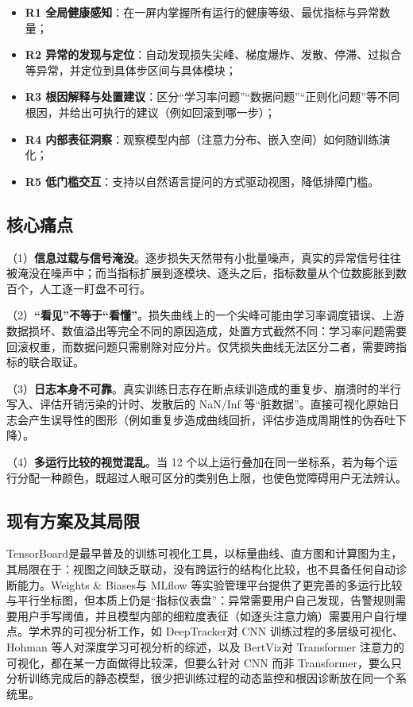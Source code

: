 \begin{itemize}
\item \textbf{R1 全局健康感知}：在一屏内掌握所有运行的健康等级、最优指标与异常数量；
\item \textbf{R2 异常的发现与定位}：自动发现损失尖峰、梯度爆炸、发散、停滞、过拟合等异常，并定位到具体步区间与具体模块；
\item \textbf{R3 根因解释与处置建议}：区分“学习率问题”“数据问题”“正则化问题”等不同根因，并给出可执行的建议（例如回滚到哪一步）；
\item \textbf{R4 内部表征洞察}：观察模型内部（注意力分布、嵌入空间）如何随训练演化；
\item \textbf{R5 低门槛交互}：支持以自然语言提问的方式驱动视图，降低排障门槛。
\end{itemize}

\subsection{核心痛点}

（1）\textbf{信息过载与信号淹没}。逐步损失天然带有小批量噪声，真实的异常信号往往被淹没在噪声中；而当指标扩展到逐模块、逐头之后，指标数量从个位数膨胀到数百个，人工逐一盯盘不可行。

（2）\textbf{“看见”不等于“看懂”}。损失曲线上的一个尖峰可能由学习率调度错误、上游数据损坏、数值溢出等完全不同的原因造成，处置方式截然不同：学习率问题需要回滚权重，而数据问题只需剔除对应分片。仅凭损失曲线无法区分二者，需要跨指标的联合取证。

（3）\textbf{日志本身不可靠}。真实训练日志存在断点续训造成的重复步、崩溃时的半行写入、评估开销污染的计时、发散后的 NaN/Inf 等“脏数据”。直接可视化原始日志会产生误导性的图形（例如重复步造成曲线回折，评估步造成周期性的伪吞吐下降）。

（4）\textbf{多运行比较的视觉混乱}。当 12 个以上运行叠加在同一坐标系，若为每个运行分配一种颜色，既超过人眼可区分的类别色上限，也使色觉障碍用户无法辨认。

\subsection{现有方案及其局限}

TensorBoard\cite{r4}是最早普及的训练可视化工具，以标量曲线、直方图和计算图为主，其局限在于：视图之间缺乏联动，没有跨运行的结构化比较，也不具备任何自动诊断能力。Weights \& Biases\cite{r5}与 MLflow 等实验管理平台提供了更完善的多运行比较与平行坐标图，但本质上仍是“指标仪表盘”：异常需要用户自己发现，告警规则需要用户手写阈值，并且模型内部的细粒度表征（如逐头注意力熵）需要用户自行埋点。学术界的可视分析工作，如 DeepTracker\cite{r6}对 CNN 训练过程的多层级可视化、Hohman 等人对深度学习可视分析的综述\cite{r7}，以及 BertViz\cite{r8}对 Transformer 注意力的可视化，都在某一方面做得比较深，但要么针对 CNN 而非 Transformer，要么只分析训练完成后的静态模型，很少把训练过程的动态监控和根因诊断放在同一个系统里。

